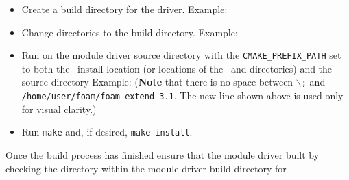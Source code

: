 \begin{itemize}
\item Create a build directory for the driver. 
\newline Example:
\newline {}
\item Change directories to the build directory. 
\newline Example:
\newline {}
\item Run  on the module driver source directory with the \texttt{CMAKE\_PREFIX\_PATH} set to both the \IMPACT\, install location (or locations of the \impact\,  and  directories) and the \openfoamex\, source directory 
\newline Example:
\newline {} 
\newline (\textbf{Note} that there is no space between $\backslash$\texttt{;} and \texttt{/home/user/foam/foam-extend-3.1}. The new line shown above is used only for visual clarity.)
\item Run \texttt{make} and, if desired, \texttt{make install}.
\end{itemize}

Once the build process has finished ensure that the module driver built by checking the  directory within the module driver build directory for 
